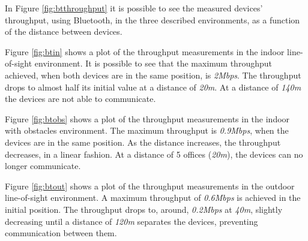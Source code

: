 In Figure \ref{fig:btthroughput} it is possible to see the measured devices' throughput, using Bluetooth, in the three described environments, as a function of the distance between devices.

Figure \ref{fig:btin} shows a plot of the throughput measurements in the indoor line-of-sight environment. It is possible to see that the maximum throughput achieved, when both devices are in the same position, is \textit{2Mbps}. The throughput drops to almost half its initial value at a distance of \textit{20m}. At a distance of \textit{140m} the devices are not able to communicate.

Figure \ref{fig:btobs} shows a plot of the throughput measurements in the indoor with obstacles environment. The maximum throughput is \textit{0.9Mbps}, when the devices are in the same position. As the distance increases, the throughput decreases, in a linear fashion. At a distance of 5 offices (\textit{20m}), the devices can no longer communicate.

Figure \ref{fig:btout} shows a plot of the throughput measurements in the outdoor line-of-sight environment. A maximum throughput of \textit{0.6Mbps} is achieved in the initial position. The throughput drops to, around, \textit{0.2Mbps} at \textit{40m}, slightly decreasing until a distance of \textit{120m} separates the devices, preventing communication between them.

